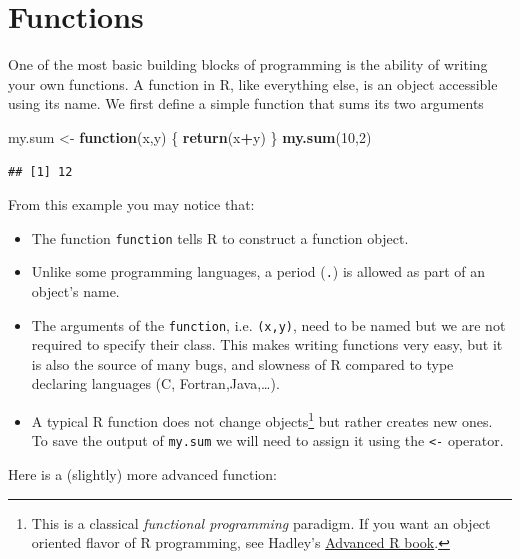 \documentclass[]{book}
\newenvironment{Shaded}{\begin{snugshade}}{\end{snugshade}}
\newcommand{\KeywordTok}[1]{\textcolor[rgb]{0.13,0.29,0.53}{\textbf{#1}}}
\newcommand{\DecValTok}[1]{\textcolor[rgb]{0.00,0.00,0.81}{#1}}
\newcommand{\StringTok}[1]{\textcolor[rgb]{0.31,0.60,0.02}{#1}}
\newcommand{\ControlFlowTok}[1]{\textcolor[rgb]{0.13,0.29,0.53}{\textbf{#1}}}
\newcommand{\OperatorTok}[1]{\textcolor[rgb]{0.81,0.36,0.00}{\textbf{#1}}}
\newcommand{\NormalTok}[1]{#1}
\theoremstyle{definition}
\theoremstyle{definition}
\theoremstyle{definition}
\theoremstyle{remark}
\begin{document}
\section{Functions}\label{functions}

One of the most basic building blocks of programming is the ability of
writing your own functions. A function in R, like everything else, is an
object accessible using its name. We first define a simple function that
sums its two arguments

\begin{Shaded}
\begin{Highlighting}[]
\NormalTok{my.sum <-}\StringTok{ }\ControlFlowTok{function}\NormalTok{(x,y) \{}
  \KeywordTok{return}\NormalTok{(x}\OperatorTok{+}\NormalTok{y)}
\NormalTok{\}}
\KeywordTok{my.sum}\NormalTok{(}\DecValTok{10}\NormalTok{,}\DecValTok{2}\NormalTok{)}
\end{Highlighting}
\end{Shaded}

\begin{verbatim}
## [1] 12
\end{verbatim}

From this example you may notice that:

\begin{itemize}
\item
  The function \texttt{function} tells R to construct a function object.
\item
  Unlike some programming languages, a period (\texttt{.}) is allowed as
  part of an object's name.
\item
  The arguments of the \texttt{function}, i.e. \texttt{(x,y)}, need to
  be named but we are not required to specify their class. This makes
  writing functions very easy, but it is also the source of many bugs,
  and slowness of R compared to type declaring languages (C,
  Fortran,Java,\ldots{}).
\item
  A typical R function does not change objects\footnote{This is a
    classical \emph{functional programming} paradigm. If you want an
    object oriented flavor of R programming, see Hadley's
    \href{http://adv-r.had.co.nz/OO-essentials.html}{Advanced R book}.}
  but rather creates new ones. To save the output of \texttt{my.sum} we
  will need to assign it using the \texttt{\textless{}-} operator.
\end{itemize}

Here is a (slightly) more advanced function:
\end{document}
